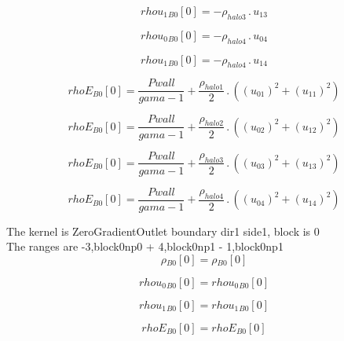 \documentclass{article}
\begin{document}
\begin{dmath}{rhou_{1}{_{B0}}}[{0}] = - \rho_{halo 3} \,.\, u_{13}\end{dmath}

\begin{dmath}{rhou_{0}{_{B0}}}[{0}] = - \rho_{halo 4} \,.\, u_{04}\end{dmath}

\begin{dmath}{rhou_{1}{_{B0}}}[{0}] = - \rho_{halo 4} \,.\, u_{14}\end{dmath}

\begin{dmath}{rhoE{_{B0}}}[{0}] = \frac{Pwall}{gama - 1} + \frac{\rho_{halo 1}}{2} \,.\, \left(\left(u_{01} \right)^{2} + \left(u_{11} \right)^{2}\right)\end{dmath}

\begin{dmath}{rhoE{_{B0}}}[{0}] = \frac{Pwall}{gama - 1} + \frac{\rho_{halo 2}}{2} \,.\, \left(\left(u_{02} \right)^{2} + \left(u_{12} \right)^{2}\right)\end{dmath}

\begin{dmath}{rhoE{_{B0}}}[{0}] = \frac{Pwall}{gama - 1} + \frac{\rho_{halo 3}}{2} \,.\, \left(\left(u_{03} \right)^{2} + \left(u_{13} \right)^{2}\right)\end{dmath}

\begin{dmath}{rhoE{_{B0}}}[{0}] = \frac{Pwall}{gama - 1} + \frac{\rho_{halo 4}}{2} \,.\, \left(\left(u_{04} \right)^{2} + \left(u_{14} \right)^{2}\right)\end{dmath}

\noindent The kernel is ZeroGradientOutlet boundary dir1 side1, block is 0\\\noindent The ranges are -3,block0np0 + 4,block0np1 - 1,block0np1\\\begin{dmath}{\rho{_{B0}}}[{0}] = {\rho{_{B0}}}[{0}]\end{dmath}

\begin{dmath}{rhou_{0}{_{B0}}}[{0}] = {rhou_{0}{_{B0}}}[{0}]\end{dmath}

\begin{dmath}{rhou_{1}{_{B0}}}[{0}] = {rhou_{1}{_{B0}}}[{0}]\end{dmath}

\begin{dmath}{rhoE{_{B0}}}[{0}] = {rhoE{_{B0}}}[{0}]\end{dmath}
\end{document}
